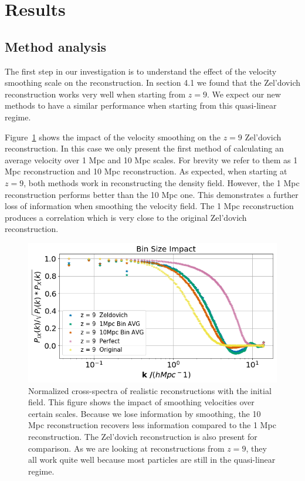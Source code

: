 \section{Results}

\subsection{Method analysis}
The first step in our investigation is to understand the effect of the velocity smoothing scale on the reconstruction. In section 4.1 we found that the Zel'dovich reconstruction works very well when starting from $z=9$. We expect our new methods to have a similar performance when starting from this quasi-linear regime. 

Figure~\ref{fig:4.2} shows the impact of the velocity smoothing on the $z=9$ Zel'dovich reconstruction. In this case we only present the first method of calculating an average velocity over 1 Mpc and 10 Mpc scales. For brevity we refer to them as 1 Mpc reconstruction and 10 Mpc reconstruction. As expected, when starting at $z=9$, both methods work in reconstructing the density field. However, the 1 Mpc reconstruction performs better than the 10 Mpc one. This demonstrates a further loss of information when smoothing the velocity field. The 1 Mpc reconstruction produces a correlation which is very close to the original Zel'dovich reconstruction.

\begin{figure}
    \centering
    \includegraphics[width=1\columnwidth]{images/realRecon/binSize.png}%
    
    \caption{
    Normalized cross-spectra of realistic reconstructions with the initial field. This figure shows the impact of smoothing velocities over certain scales. Because we lose information by smoothing, the 10 Mpc reconstruction recovers less information compared to the 1 Mpc reconstruction. The Zel'dovich reconstruction is also present for comparison. As we are looking at reconstructions from $z=9$, they all work quite well because most particles are still in the quasi-linear regime.
    }
    
    \label{fig:4.2}
\end{figure}

